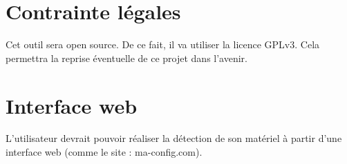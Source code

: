 \documentclass[16pts]{report}
\begin{document}
\section{Contrainte légales}
\label{sec:Contrainte légales}

Cet outil sera open source. De ce fait, il va utiliser la licence GPLv3. Cela
permettra la reprise éventuelle de ce projet dans l’avenir.

\section{Interface web}
\label{sec:Interface web}

L’utilisateur devrait pouvoir réaliser la détection de son matériel à partir
d’une interface web (comme le site : ma-config.com).
\end{document}
